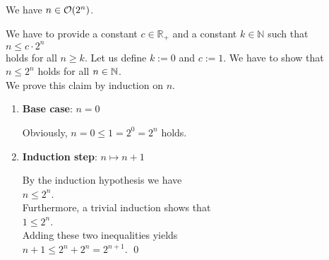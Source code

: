 \example
We have  $n \in \mathcal{O}(2^n)$. 
\ex

\proof
We have to provide a constant $c \in \mathbb{R}_+$ and a constant $k\in\mathbb{N}$ such that 
\\[0.2cm]
\hspace*{1.3cm}
$ n \leq c \cdot 2^n$ 
\\[0.2cm]
holds for all $n \geq k$.  Let us define $k := 0$ and $c := 1$.  We have to show that \\[0.2cm]
\hspace*{1.3cm} $n \leq 2^n$ \quad holds for all $n \in {\mathbb N}$.
\\[0.2cm]
We prove this claim by induction on $n$.
\begin{enumerate}
\item \textbf{Base case}: $n = 0$

      Obviously, $n = 0 \leq 1 = 2^0 = 2^n$ holds.  
\item \textbf{Induction step}: $n \mapsto n + 1$

      By the induction hypothesis we have 
      \\[0.2cm]
      \hspace*{1.3cm}
      $n \leq 2^n$.    
      \\[0.2cm]
      Furthermore, a trivial induction shows that
      \\[0.2cm]
      \hspace*{1.3cm}
      $1 \leq 2^n$.
      \\[0.2cm]
      Adding these two inequalities yields
      \\[0.2cm]
      \hspace*{1.3cm} $n+1 \leq 2^n + 2^n = 2^{n+1}$. \qed
\end{enumerate} 

